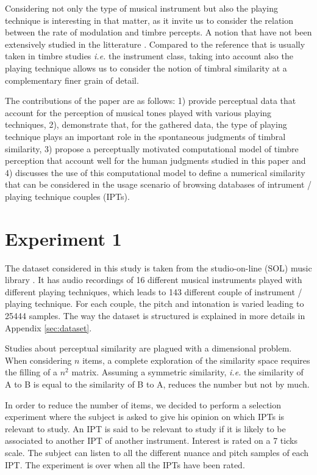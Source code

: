 \documentclass{article}
\newcommand{\ipt}{IPT\xspace}
\newcommand{\ipts}{IPTs\xspace}
\begin{document}
Considering not only the type of musical instrument but also the playing technique is interesting in that matter, as it invite us to consider the relation between the rate of modulation and timbre percepts. A notion that have not been extensively studied in the litterature \cite{burred2010dynamic}. Compared to the reference that is usually taken in timbre studies \textit{i.e.} the instrument class, taking into account also the playing technique allows us to consider the notion of timbral similarity at a complementary finer grain of detail.

The contributions of the paper are as follows: 1) provide perceptual data that account for the perception of musical tones played with various playing techniques, 2), demonstrate that, for the gathered data, the type of playing technique plays an important role in the spontaneous judgments of timbral similarity, 3) propose a perceptually motivated computational model of timbre perception that account well for the human judgments studied in this paper and 4) discusses the use of this computational model to define a numerical similarity that can be considered in the usage scenario of browsing databases of intrument / playing technique couples (\ipts).

\section{Experiment 1}\label{sec:xp1}

The dataset considered in this study is taken from the studio-on-line (SOL) music library  \cite{peeters2000instrument}. It has audio recordings of 16 different musical instruments played with different playing techniques, which leads to 143 different couple of instrument / playing technique. For each couple, the pitch and intonation is varied leading to 25444 samples. The way the dataset is structured is explained in more details in Appendix \ref{sec:dataset}.

Studies about perceptual similarity are plagued with a dimensional problem. When considering $n$ items, a complete exploration of the similarity space requires the filling of a $n^2$ matrix. Assuming a symmetric similarity, \textit{i.e.} the similarity of A to B is equal to the similarity of B to A, reduces the number but not by much.

In order to reduce the number of items, we decided to perform a selection experiment where the subject is asked to give his opinion on which \ipts is relevant to study. An \ipt is said to be relevant to study if it is likely to be associated to another \ipt of another instrument. Interest is rated on a 7 ticks scale. The subject can listen to all the different nuance and pitch samples of each \ipt. The experiment is over when all the \ipts have been rated.
\end{document}
